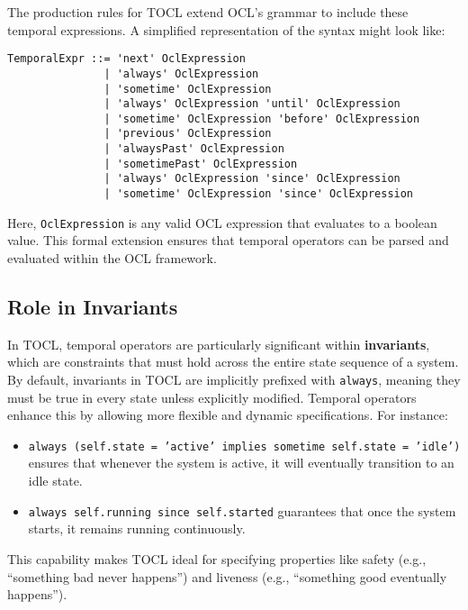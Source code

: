 The production rules for TOCL extend OCL’s grammar to include these temporal expressions. A simplified representation of the syntax might look like:
\begin{verbatim}
TemporalExpr ::= 'next' OclExpression
               | 'always' OclExpression
               | 'sometime' OclExpression
               | 'always' OclExpression 'until' OclExpression
               | 'sometime' OclExpression 'before' OclExpression
               | 'previous' OclExpression
               | 'alwaysPast' OclExpression
               | 'sometimePast' OclExpression
               | 'always' OclExpression 'since' OclExpression
               | 'sometime' OclExpression 'since' OclExpression
\end{verbatim}
Here, \texttt{OclExpression} is any valid OCL expression that evaluates to a boolean value. This formal extension ensures that temporal operators can be parsed and evaluated within the OCL framework.

\subsection*{Role in Invariants}
In TOCL, temporal operators are particularly significant within \textbf{invariants}, which are constraints that must hold across the entire state sequence of a system. By default, invariants in TOCL are implicitly prefixed with \texttt{always}, meaning they must be true in every state unless explicitly modified. Temporal operators enhance this by allowing more flexible and dynamic specifications. For instance:
\begin{itemize}
    \item \texttt{always (self.state = 'active' implies sometime self.state = 'idle')} ensures that whenever the system is active, it will eventually transition to an idle state.
    \item \texttt{always self.running since self.started} guarantees that once the system starts, it remains running continuously.
\end{itemize}
This capability makes TOCL ideal for specifying properties like safety (e.g., “something bad never happens”) and liveness (e.g., “something good eventually happens”).

